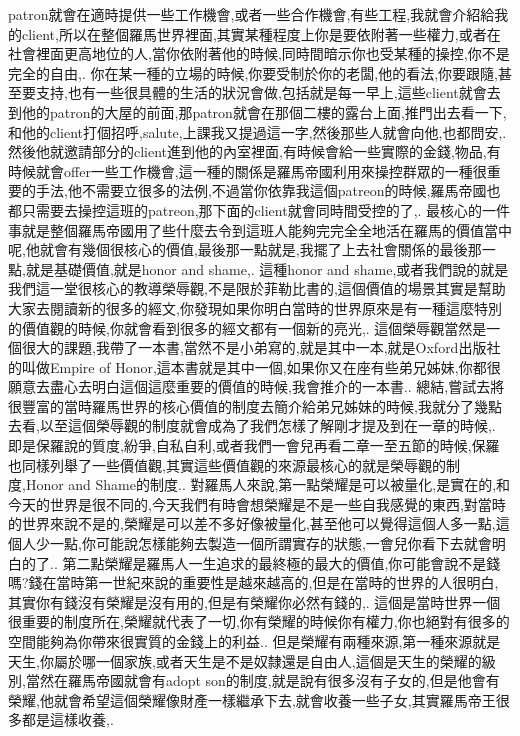 \documentclass{book}
\begin{document}
patron就會在適時提供一些工作機會,或者一些合作機會,有些工程,我就會介紹給我的client,所以在整個羅馬世界裡面,其實某種程度上你是要依附著一些權力,或者在社會裡面更高地位的人,當你依附著他的時候,同時間暗示你也受某種的操控,你不是完全的自由,.
你在某一種的立場的時候,你要受制於你的老闆,他的看法,你要跟隨,甚至要支持,也有一些很具體的生活的狀況會做,包括就是每一早上,這些client就會去到他的patron的大屋的前面,那patron就會在那個二樓的露台上面,推門出去看一下,和他的client打個招呼,salute,上課我又提過這一字,然後那些人就會向他,也都問安,.
然後他就邀請部分的client進到他的內室裡面,有時候會給一些實際的金錢,物品,有時候就會offer一些工作機會,這一種的關係是羅馬帝國利用來操控群眾的一種很重要的手法,他不需要立很多的法例,不過當你依靠我這個patreon的時候,羅馬帝國也都只需要去操控這班的patreon,那下面的client就會同時間受控的了,.
最核心的一件事就是整個羅馬帝國用了些什麼去令到這班人能夠完完全全地活在羅馬的價值當中呢,他就會有幾個很核心的價值,最後那一點就是,我擺了上去社會關係的最後那一點,就是基礎價值,就是honor and shame,.
這種honor and shame,或者我們說的就是我們這一堂很核心的教導榮辱觀,不是限於菲勒比書的,這個價值的場景其實是幫助大家去閱讀新的很多的經文,你發現如果你明白當時的世界原來是有一種這麼特別的價值觀的時候,你就會看到很多的經文都有一個新的亮光,.
這個榮辱觀當然是一個很大的課題,我帶了一本書,當然不是小弟寫的,就是其中一本,就是Oxford出版社的叫做Empire of Honor,這本書就是其中一個,如果你又在座有些弟兄姊妹,你都很願意去盡心去明白這個這麼重要的價值的時候,我會推介的一本書..
總結,嘗試去將很豐富的當時羅馬世界的核心價值的制度去簡介給弟兄姊妹的時候,我就分了幾點去看,以至這個榮辱觀的制度就會成為了我們怎樣了解剛才提及到在一章的時候,.
即是保羅說的質度,紛爭,自私自利,或者我們一會兒再看二章一至五節的時候,保羅也同樣列舉了一些價值觀,其實這些價值觀的來源最核心的就是榮辱觀的制度,Honor and Shame的制度..
對羅馬人來說,第一點榮耀是可以被量化,是實在的,和今天的世界是很不同的,今天我們有時會想榮耀是不是一些自我感覺的東西,對當時的世界來說不是的,榮耀是可以差不多好像被量化,甚至他可以覺得這個人多一點,這個人少一點,你可能說怎樣能夠去製造一個所謂實存的狀態,一會兒你看下去就會明白的了..
第二點榮耀是羅馬人一生追求的最終極的最大的價值,你可能會說不是錢嗎?錢在當時第一世紀來說的重要性是越來越高的,但是在當時的世界的人很明白,其實你有錢沒有榮耀是沒有用的,但是有榮耀你必然有錢的,.
這個是當時世界一個很重要的制度所在,榮耀就代表了一切,你有榮耀的時候你有權力,你也絕對有很多的空間能夠為你帶來很實質的金錢上的利益..
但是榮耀有兩種來源,第一種來源就是天生,你屬於哪一個家族,或者天生是不是奴隸還是自由人,這個是天生的榮耀的級別,當然在羅馬帝國就會有adopt son的制度,就是說有很多沒有子女的,但是他會有榮耀,他就會希望這個榮耀像財產一樣繼承下去,就會收養一些子女,其實羅馬帝王很多都是這樣收養,.
\end{document}
